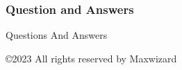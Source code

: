 \documentclass{beamer}
\begin{document}
\begin{frame}
  \frametitle{Question and Answers}
  \begin{minipage}[t][.8\textheight]{\textwidth}
    \begin{center}
     \Huge{Questions And Answers}
     
    \end{center}
    
    \vfill
    
   \small \copyright 2023 All rights reserved by Maxwizard
  \end{minipage}
\end{frame}
\end{document}
